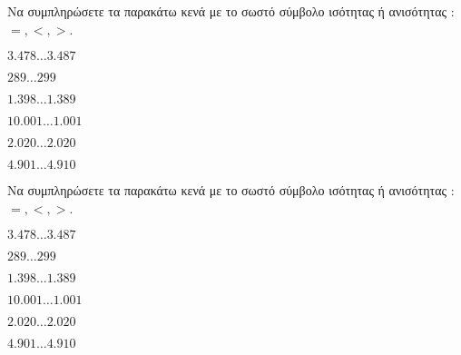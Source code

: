 Να συμπληρώσετε τα παρακάτω κενά με το σωστό σύμβολο ισότητας ή ανισότητας : $ =,<,> $.
\begin{multicols}{2}
\begin{rlist}
\item $ 3.478\ldots3.487 $
\item $ 289\ldots299 $
\item $ 1.398\ldots1.389 $
\item $ 10.001\ldots1.001 $
\item $ 2.020\ldots2.020 $
\item $ 4.901\ldots4.910 $
\end{rlist}
\end{multicols}
Να συμπληρώσετε τα παρακάτω κενά με το σωστό σύμβολο ισότητας ή ανισότητας : $ =,<,> $.
\begin{multicols}{2}
\begin{rlist}
\item $ 3.478\ldots3.487 $
\item $ 289\ldots299 $
\item $ 1.398\ldots1.389 $
\item $ 10.001\ldots1.001 $
\item $ 2.020\ldots2.020 $
\item $ 4.901\ldots4.910 $
\end{rlist}
\end{multicols}

